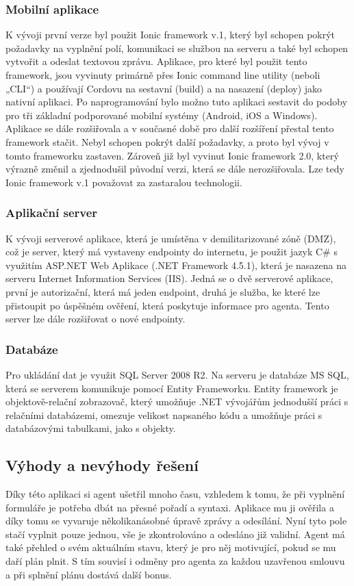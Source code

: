 \documentclass[11pt,twoside,a4paper]{book}
\begin{document}
\subsubsection{Mobilní aplikace}
K vývoji první verze byl použit Ionic framework v.1, který byl schopen pokrýt požadavky na vyplnění polí, komunikaci se službou na serveru a také byl schopen vytvořit a odeslat textovou zprávu. Aplikace, pro které byl použit tento framework, jsou vyvinuty primárně přes Ionic command line utility (neboli „CLI“) a používají Cordovu na sestavní (build) a na nasazení (deploy) jako nativní aplikaci. Po naprogramování bylo možno tuto aplikaci sestavit do podoby pro tři základní podporované mobilní systémy (Android, iOS a Windows). Aplikace se dále rozšiřovala a v současné době pro další rozšíření přestal tento framework stačit. Nebyl schopen pokrýt další požadavky, a proto byl vývoj v tomto frameworku zastaven. Zároveň již byl vyvinut Ionic framework 2.0, který výrazně změnil a zjednodušil původní verzi, která se dále nerozšiřovala. Lze tedy Ionic framework v.1 považovat za zastaralou technologii. \cite{ionicframework}

\subsubsection{Aplikační server}
K vývoji serverové aplikace, která je umístěna v demilitarizované zóně (DMZ), což je server, který má vystaveny endpointy do internetu, je použit jazyk C\# s využitím ASP.NET Web Aplikace (.NET Framework 4.5.1), která je nasazena na serveru Internet Information Services (IIS). Jedná se o dvě serverové aplikace, první je autorizační, která má jeden endpoint, druhá je služba, ke které lze přistoupit po úspěšném ověření, která poskytuje informace pro agenta. Tento server lze dále rozšiřovat o nové endpointy.

\subsubsection{Databáze}
Pro ukládání dat je využit SQL Server 2008 R2. Na serveru je databáze MS SQL, která se serverem komunikuje pomocí Entity Frameworku. Entity framework je objektově-relační zobrazovač, který umožňuje .NET vývojářům jednodušší práci s relačními databázemi, omezuje velikost napsaného kódu a umožňuje práci s databázovými tabulkami, jako s objekty. \cite{entityFramework}

\subsection{Výhody a nevýhody řešení}
Díky této aplikaci si agent ušetřil mnoho času, vzhledem k tomu, že při vyplnění formuláře je potřeba dbát na přesné pořadí a syntaxi. Aplikace mu ji ověřila a díky tomu se vyvaruje několikanásobné úpravě zprávy a odesílání. Nyní tyto pole stačí vyplnit pouze jednou, vše je zkontrolováno a odesláno již validní. Agent má také přehled o svém aktuálním stavu, který je pro něj motivující, pokud se mu daří plán plnit. S tím souvisí i odměny pro agenta za každou uzavřenou smlouvu a při splnění plánu dostává další bonus.
\end{document}
